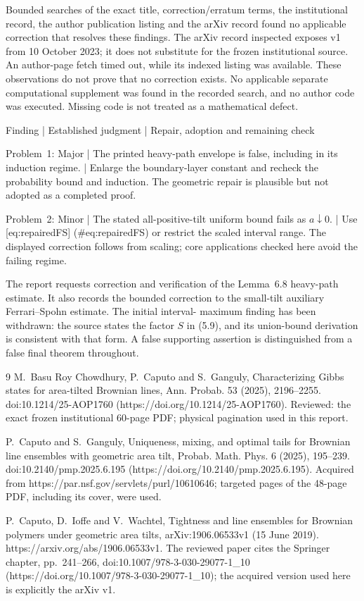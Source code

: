 \documentclass[10pt]{article}
\begin{document}
Bounded searches of the exact title, correction/erratum terms, the institutional record, the author publication listing and the arXiv record found no applicable correction that resolves these findings. The arXiv record inspected exposes v1 from 10 October 2023; it does not substitute for the frozen institutional source. An author-page fetch timed out, while its indexed listing was available. These observations do not prove that no correction exists. No applicable separate computational supplement was found in the recorded search, and no author code was executed. Missing code is not treated as a mathematical defect.\par
Finding | Established judgment | Repair, adoption and remaining check\par
Problem 1: Major | The printed heavy-path envelope is false, including in its induction regime. | Enlarge the boundary-layer constant and recheck the probability bound and induction. The geometric repair is plausible but not adopted as a completed proof.\par
Problem 2: Minor | The stated all-positive-tilt uniform bound fails as \(a\downarrow0\). | Use [eq:repairedFS] (\#eq:repairedFS) or restrict the scaled interval range. The displayed correction follows from scaling; core applications checked here avoid the failing regime.\par
The report requests correction and verification of the Lemma 6.8 heavy-path estimate. It also records the bounded correction to the small-tilt auxiliary Ferrari–Spohn estimate. The initial interval- maximum finding has been withdrawn: the source states the factor \(S\) in (5.9), and its union-bound derivation is consistent with that form. A false supporting assertion is distinguished from a false final theorem throughout.\par
9 M. Basu Roy Chowdhury, P. Caputo and S. Ganguly, Characterizing Gibbs states for area-tilted Brownian lines, Ann. Probab. 53 (2025), 2196–2255. doi:10.1214/25-AOP1760 (https://doi.org/10.1214/25-AOP1760). Reviewed: the exact frozen institutional 60-page PDF; physical pagination used in this report.\par
P. Caputo and S. Ganguly, Uniqueness, mixing, and optimal tails for Brownian line ensembles with geometric area tilt, Probab. Math. Phys. 6 (2025), 195–239. doi:10.2140/pmp.2025.6.195 (https://doi.org/10.2140/pmp.2025.6.195). Acquired from https://par.nsf.gov/servlets/purl/10610646; targeted pages of the 48-page PDF, including its cover, were used.\par
P. Caputo, D. Ioffe and V. Wachtel, Tightness and line ensembles for Brownian polymers under geometric area tilts, arXiv:1906.06533v1 (15 June 2019). https://arxiv.org/abs/1906.06533v1. The reviewed paper cites the Springer chapter, pp. 241–266, doi:10.1007/978-3-030-29077-1\_10 (https://doi.org/10.1007/978-3-030-29077-1\_10); the acquired version used here is explicitly the arXiv v1.\par
\end{document}
